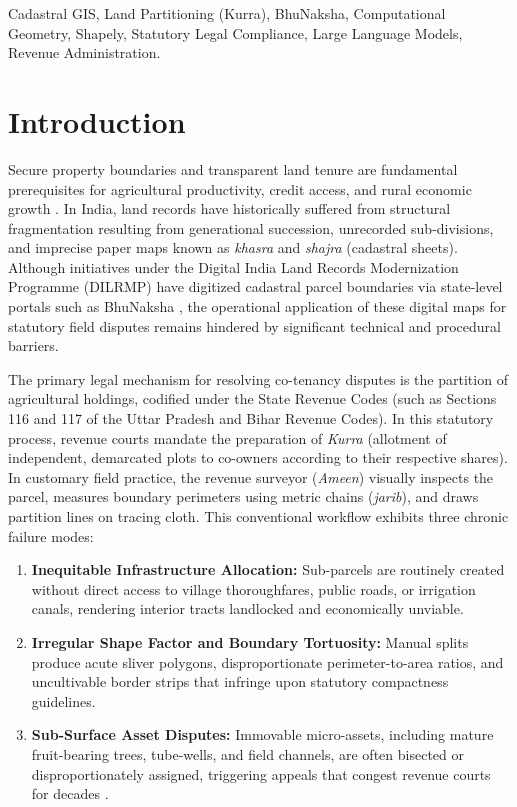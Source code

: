 \documentclass[conference]{IEEEtran}
\begin{document}
\begin{IEEEkeywords}
Cadastral GIS, Land Partitioning (Kurra), BhuNaksha, Computational Geometry, Shapely, Statutory Legal Compliance, Large Language Models, Revenue Administration.
\end{IEEEkeywords}

\section{Introduction}
Secure property boundaries and transparent land tenure are fundamental prerequisites for agricultural productivity, credit access, and rural economic growth \cite{deininger2003land}. In India, land records have historically suffered from structural fragmentation resulting from generational succession, unrecorded sub-divisions, and imprecise paper maps known as \textit{khasra} and \textit{shajra} (cadastral sheets). Although initiatives under the Digital India Land Records Modernization Programme (DILRMP) have digitized cadastral parcel boundaries via state-level portals such as BhuNaksha \cite{national2021dilrmp}, the operational application of these digital maps for statutory field disputes remains hindered by significant technical and procedural barriers.

The primary legal mechanism for resolving co-tenancy disputes is the partition of agricultural holdings, codified under the State Revenue Codes (such as Sections 116 and 117 of the Uttar Pradesh and Bihar Revenue Codes). In this statutory process, revenue courts mandate the preparation of \textit{Kurra} (allotment of independent, demarcated plots to co-owners according to their respective shares). In customary field practice, the revenue surveyor (\textit{Ameen}) visually inspects the parcel, measures boundary perimeters using metric chains (\textit{jarib}), and draws partition lines on tracing cloth. This conventional workflow exhibits three chronic failure modes:
\begin{enumerate}
    \item \textbf{Inequitable Infrastructure Allocation:} Sub-parcels are routinely created without direct access to village thoroughfares, public roads, or irrigation canals, rendering interior tracts landlocked and economically unviable.
    \item \textbf{Irregular Shape Factor and Boundary Tortuosity:} Manual splits produce acute sliver polygons, disproportionate perimeter-to-area ratios, and uncultivable border strips that infringe upon statutory compactness guidelines.
    \item \textbf{Sub-Surface Asset Disputes:} Immovable micro-assets, including mature fruit-bearing trees, tube-wells, and field channels, are often bisected or disproportionately assigned, triggering appeals that congest revenue courts for decades \cite{wadhwa2002guaranteeing}.
\end{enumerate}
\end{document}
